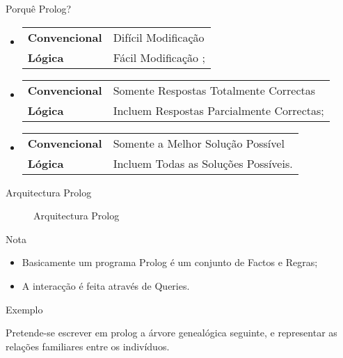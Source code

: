 \documentclass[portuges]{beamer}
\begin{document}
\begin{frame}{Porquê Prolog?}
\begin{itemize}[<+->]
\item 
	\begin{tabular}{p{3cm}p{5cm}}
{\textbf{Convencional}} & Difícil Modificação \\
{\textbf{Lógica}}  & Fácil Modificação ;
	\end{tabular}
\item 
	\begin{tabular}{p{3cm}p{5cm}}
{\textbf{Convencional}} & Somente Respostas Totalmente Correctas \\
{\textbf{Lógica}}  & Incluem Respostas Parcialmente Correctas;
	\end{tabular}
\item 
	\begin{tabular}{p{3cm}p{5cm}}
{\textbf{Convencional}} & Somente a Melhor Solução Possível  \\
{\textbf{Lógica}}  &  Incluem Todas as Soluções Possíveis.  
	\end{tabular}
\end{itemize}

\end{frame}

\begin{frame}{Arquitectura Prolog}
\begin{figure}
\centering
{}
\caption{Arquitectura Prolog}
\end{figure}
\end{frame}

\begin{frame}{Nota}
\begin{itemize}
	\item Basicamente um programa Prolog é um conjunto de \alert{Factos} e \alert{Regras};
	\item A interacção é feita através de \alert{Queries}.
\end{itemize}
\end{frame}

\begin{frame}{Exemplo}
	\begin{example}				
		Pretende-se escrever em prolog a árvore genealógica seguinte,
		e representar as relações familiares entre os indivíduos.
		\begin{figure}
			\centering
		\end{figure}		
	\end{example}
\end{frame}
\end{document}
